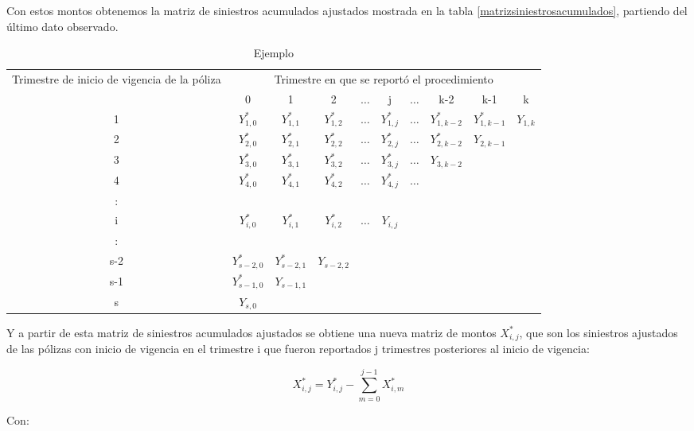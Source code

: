 \documentclass[11pt,twoside,openright,spanish]{report}
\numberwithin{equation}{chapter}
\numberwithin{figure}{chapter}
\numberwithin{table}{chapter}
\begin{document}
	Con estos montos obtenemos la matriz de siniestros acumulados ajustados mostrada en la tabla \ref{matrizsiniestrosacumulados}, partiendo del último dato observado.
		
	\begin{table}[ht]
		\centering
		\caption{Ejemplo }
		\begin{tabularx}{\linewidth}{ c |ccccccccc}
			\multirow{2}{4cm}{Trimestre de inicio de vigencia de la póliza}
			& \multicolumn{9}{c}{Trimestre en que se reportó el procedimiento} \\ 
			& 0  & 1 & 2 & $ \dots $ & j & $\dots $ & k-2 & k-1 &  k \\
			\midrule
			1      &  $Y_{1,0}^{*}$ & $Y_{1,1}^{*}$ & $Y_{1,2}^{*}$ & $ \dots $ & $Y_{1,j}^{*}$ & $ \dots $ & $Y_{1,k-2}^{*}$ & $Y_{1,k-1}^{*}$ & $Y_{1,k}^{}$ \\
			2      &  $Y_{2,0}^{*}$ & $Y_{2,1}^{*}$ & $Y_{2,2}^{*}$ & $ \dots $ & $Y_{2,j}^{*}$ & $ \dots $ & $Y_{2,k-2}^{*}$ & $Y_{2,k-1}^{}$ & \\
			3      &  $Y_{3,0}^{*}$ & $Y_{3,1}^{*}$ & $Y_{3,2}^{*}$ & $ \dots $ & $Y_{3,j}^{*}$ & $ \dots $ & $Y_{3,k-2}^{}$ & & \\
			4      &  $Y_{4,0}^{*}$ & $Y_{4,1}^{*}$ & $Y_{4,2}^{*}$ & $ \dots $ & $Y_{4,j}^{*}$ & $ \dots $ & & & \\
			:      & & & & & & & & & \\
			i      &  $Y_{i,0}^{*}$ & $Y_{i,1}^{*}$ & $Y_{i,2}^{*}$ & $ \dots $ & $Y_{i,j}^{}$ & & & & \\
			:      & & & & & & & & & \\
			s-2      &  $Y_{s-2,0}^{*}$ & $Y_{s-2,1}^{*}$ & $Y_{s-2,2}^{}$ & & & & & & \\
			s-1      &  $Y_{s-1,0}^{*}$ & $Y_{s-1,1}^{}$ & & & & & & & \\
			s      &  $Y_{s,0}^{}$ & & & & & & & & \\
		\end{tabularx}
	\end{table}\label{matrizsiniestrosacumulados}
	
	Y a partir de esta matriz de siniestros acumulados ajustados se obtiene una nueva matriz de montos $X_{i,j}^{*}$, que son los siniestros ajustados de las pólizas con inicio de vigencia en el trimestre i que fueron reportados j trimestres posteriores al inicio de vigencia:
	
	$${X}_{i,j}^{*}={Y}_{i,j}^{*}-\sum _{m=0}^{j-1}{X}_{i,m}^{*}$$	
	 
	Con:
	
\end{document}
